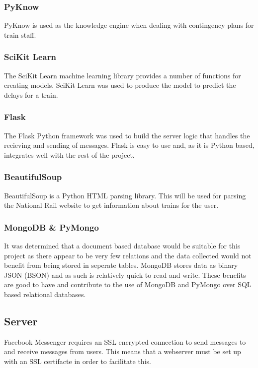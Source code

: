 \documentclass[12pt,a4paper]{article}
\begin{document}
    \subsubsection{PyKnow}
    PyKnow is used as the knowledge engine when dealing with contingency plans for train staff. 
    
    \subsubsection{SciKit Learn}
    The SciKit Learn machine learning library provides a number of functions for creating models. SciKit Learn was used to produce the model to predict the delays for a train.
    
    \subsubsection{Flask}
    The Flask Python framework was used to build the server logic that handles the recieving and sending of messages. Flask is easy to use and, as it is Python based, integrates well with the rest of the project.
    
    \subsubsection{BeautifulSoup}
    \label{subsubsection:BeautifulSoup}
    BeautifulSoup is a Python HTML parsing library. This will be used for parsing the National Rail website to get information about trains for the user.
    
    \subsubsection{MongoDB \& PyMongo}
    \label{subsubsection:mongodb}
    It was determined that a document based database would be suitable for this project as there appear to be very few relations and the data collected would not benefit from being stored in seperate tables. MongoDB stores data as binary JSON (BSON) \citep{korneliusz_2014} and as such is relatively quick to read and write. These benefits are good to have and contribute to the use of MongoDB and PyMongo over SQL based relational databases.
    
    \subsection{Server}
    \label{subsection:Server}
    Facebook Messenger requires an SSL encrypted connection to send messages to and receive messages from users. This means that a webserver must be set up with an SSL certifacte in order to facilitate this.
\end{document}
